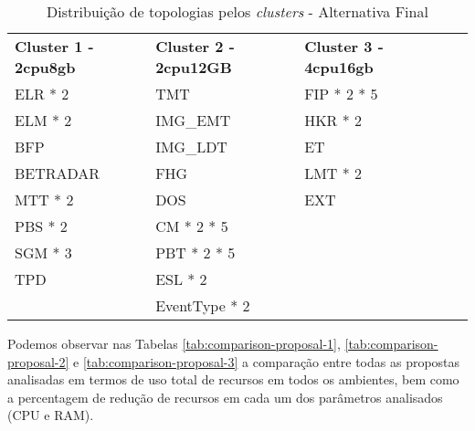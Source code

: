 \begin{table}[H]
  \centering
  \begin{tabular}{|l|l|l|l|l|}
    \hline
    \rowcolor[HTML]{FBE6A3} 
    \multicolumn{3}{|c|}{\textbf{Alternativa Final}} \\ \hline
    \rowcolor[HTML]{4EAC5B} 
     \textbf{Cluster 1 - 2cpu8gb} & \textbf{Cluster 2 - 2cpu12GB} & \textbf{Cluster 3 - 4cpu16gb}  \\ \hline
     \cellcolor[HTML]{A9D08E} ELR * 2 & \cellcolor[HTML]{BDD7EE} TMT  & \cellcolor[HTML]{A9D08E} FIP * 2 * 5  \\ \hline
     \cellcolor[HTML]{A9D08E} ELM * 2 & \cellcolor[HTML]{BDD7EE} IMG\_EMT  & \cellcolor[HTML]{A9D08E} HKR * 2 \\ \hline
     \cellcolor[HTML]{A9D08E} BFP & \cellcolor[HTML]{BDD7EE} IMG\_LDT  & \cellcolor[HTML]{BDD7EE} ET  \\ \hline
     \cellcolor[HTML]{A9D08E} BETRADAR & \cellcolor[HTML]{BDD7EE} FHG  & \cellcolor[HTML]{BDD7EE} LMT * 2  \\ \hline
     \cellcolor[HTML]{BDD7EE} MTT * 2 & \cellcolor[HTML]{BDD7EE} DOS  & \cellcolor[HTML]{BDD7EE} EXT  \\ \hline
     \cellcolor[HTML]{BDD7EE} PBS * 2 & \cellcolor[HTML]{BDD7EE} CM * 2 * 5  & \cellcolor{white}  \\ \hline
     \cellcolor[HTML]{BDD7EE} SGM * 3 & \cellcolor[HTML]{A9D08E} PBT * 2 * 5  & \cellcolor{white} \\ \hline
     \cellcolor[HTML]{BDD7EE} TPD & \cellcolor[HTML]{A9D08E} ESL * 2 & \cellcolor{white} \\ \hline
     \cellcolor{white} & \cellcolor[HTML]{A9D08E} EventType * 2 & \cellcolor{white}  \\ \hline

  \end{tabular}
  \caption{Distribuição de topologias pelos \textit{clusters} - Alternativa Final}
  \label{tab:proposal-final}
\end{table}

Podemos observar nas Tabelas \ref{tab:comparison-proposal-1}, \ref{tab:comparison-proposal-2} e 
\ref{tab:comparison-proposal-3} a comparação entre todas as propostas analisadas em termos de uso 
total de recursos em todos os ambientes, bem como a percentagem de redução de recursos em cada um 
dos parâmetros analisados (\ac{CPU} e RAM).

